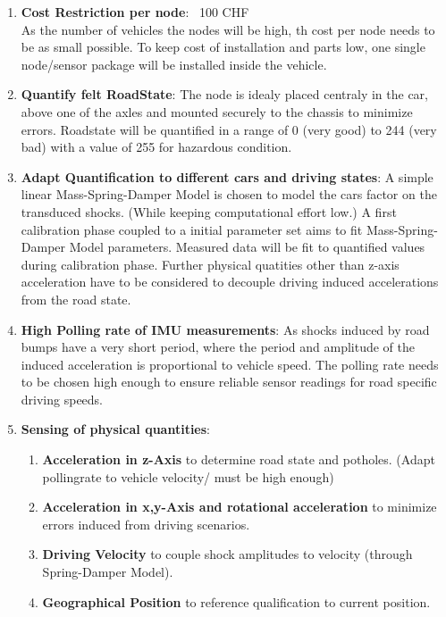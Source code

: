 \begin{enumerate}
    \item \textbf{Cost Restriction per node}: ~100 CHF  \\
       As the number of vehicles the nodes will be high, th cost per node needs to be as small possible. To keep cost of installation and parts low, one single node/sensor package will be installed inside the vehicle.
    
    \item \textbf{Quantify felt RoadState}:
       The node is idealy placed centraly in the car, above one of the axles and mounted securely to the chassis to minimize errors.
       Roadstate will be quantified in a range of 0 (very good) to 244 (very bad) with a value of 255 for hazardous condition.
    
    \item \textbf{Adapt Quantification to different cars and driving states}:
       A simple linear Mass-Spring-Damper Model is chosen to model the cars factor on the transduced shocks. (While keeping computational effort low.)
       A first calibration phase coupled to a initial parameter set aims to fit Mass-Spring-Damper Model parameters.
       Measured data will be fit to quantified values during calibration phase.
       Further physical quatities other than z-axis acceleration have to be considered to decouple driving induced accelerations from the road state.
    
    \item \textbf{High Polling rate of IMU measurements}:
       As shocks induced by road bumps have a very short period, where the period and amplitude of the induced acceleration is proportional to vehicle speed. The polling rate needs to be chosen high enough to ensure reliable sensor readings for road specific driving speeds.
    
    \item \textbf{Sensing of physical quantities}:
       \begin{enumerate}
       \item \textbf{Acceleration in z-Axis} to determine road state and potholes. (Adapt pollingrate to vehicle velocity/ must be high enough)
       \item \textbf{Acceleration in x,y-Axis and rotational acceleration} to minimize errors induced from driving scenarios.
       \item \textbf{Driving Velocity} to couple shock amplitudes to velocity (through Spring-Damper Model).
       \item \textbf{Geographical Position} to reference qualification to current position.
       \end{enumerate}
    

\end{enumerate}
